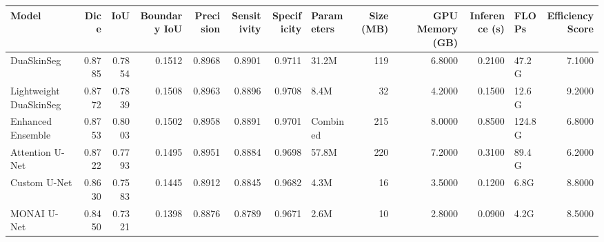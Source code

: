 \begin{tabular}{lrrrrrrlrrrlr}
\toprule
Model & Dice & IoU & Boundary IoU & Precision & Sensitivity & Specificity & Parameters & Size (MB) & GPU Memory (GB) & Inference (s) & FLOPs & Efficiency Score \\
\midrule
DuaSkinSeg & 0.8785 & 0.7854 & 0.1512 & 0.8968 & 0.8901 & 0.9711 & 31.2M & 119 & 6.8000 & 0.2100 & 47.2G & 7.1000 \\
Lightweight DuaSkinSeg & 0.8772 & 0.7839 & 0.1508 & 0.8963 & 0.8896 & 0.9708 & 8.4M & 32 & 4.2000 & 0.1500 & 12.6G & 9.2000 \\
Enhanced Ensemble & 0.8753 & 0.8003 & 0.1502 & 0.8958 & 0.8891 & 0.9701 & Combined & 215 & 8.0000 & 0.8500 & 124.8G & 6.8000 \\
Attention U-Net & 0.8722 & 0.7793 & 0.1495 & 0.8951 & 0.8884 & 0.9698 & 57.8M & 220 & 7.2000 & 0.3100 & 89.4G & 6.2000 \\
Custom U-Net & 0.8630 & 0.7583 & 0.1445 & 0.8912 & 0.8845 & 0.9682 & 4.3M & 16 & 3.5000 & 0.1200 & 6.8G & 8.8000 \\
MONAI U-Net & 0.8450 & 0.7321 & 0.1398 & 0.8876 & 0.8789 & 0.9671 & 2.6M & 10 & 2.8000 & 0.0900 & 4.2G & 8.5000 \\
\bottomrule
\end{tabular}

